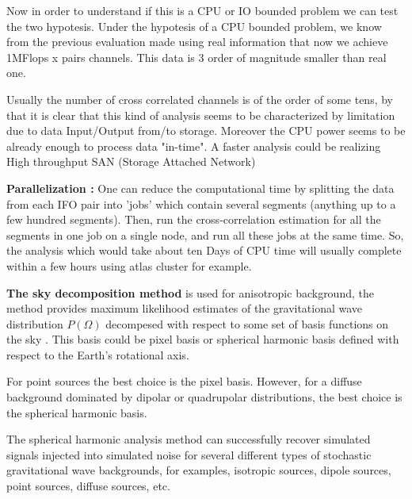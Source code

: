     Now in order to understand if this is a CPU or IO bounded problem we can test the two hypotesis.
    Under the hypotesis of a CPU bounded problem,  we know from the previous evaluation made using real information that now we achieve 1MFlops x pairs channels. This data is 3 order of magnitude smaller than real one.

    Usually the number of cross correlated channels is of the order of some tens, by that it is clear that this kind of analysis seems to be characterized by limitation due to data Input/Output from/to storage. Moreover the CPU power seems to be already enough to process data "in-time".  A faster analysis could be realizing High throughput SAN (Storage Attached Network) 
    
    {\bf Parallelization :}   One can reduce the computational time by splitting the data from each IFO pair into 'jobs' which contain several segments (anything up to a few hundred segments).  Then, run the cross-correlation estimation %
for all the segments in one job on a single node, and  run all these jobs at the same time. So, the analysis which would take about ten Days of CPU time will usually complete within a few hours using  atlas cluster for example. %
   
    


{\bf The sky decomposition method} is used for anisotropic background, the method provides maximum likelihood estimates of the gravitational wave distribution $P(\Omega)$ decompesed with respect to some set of basis functions on the sky \cite{THRANE2009}. This basis could be pixel basis or spherical harmonic basis defined with respect to the Earth's rotational axis.

For point sources the best choice is the pixel basis. However, for a diffuse background dominated by dipolar or quadrupolar distributions, the best choice is the spherical harmonic basis. 

The spherical harmonic analysis method can successfully recover simulated signals injected into simulated noise for several different types of stochastic gravitational wave backgrounds, for examples, isotropic sources, dipole sources, point sources, diffuse sources, etc.


